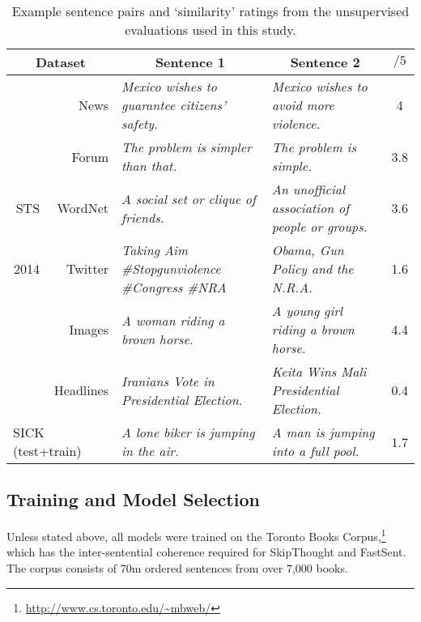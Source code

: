 \begin{table*}[ht]
\begin{adjustwidth}{-0.6cm}{}
\renewcommand{\tabcolsep}{4.6pt}
\small
\newcommand{\mc}[1]{\multicolumn{1}{l|}{#1}}
  \begin{center}

      {
        \begin{tabular}{rr|l|l|c}
          \multicolumn{2}{c|}{Dataset} & \multicolumn{1}{c}{Sentence 1} &\multicolumn{1}{|c|}{Sentence 2} & \(/5\)  \\
          \hline
          \hline
           & News &  \emph{Mexico wishes to guarantee citizens' safety.} &\emph{Mexico wishes to avoid more violence.} & 4 \\
           & Forum &  \emph{The problem is simpler than that.} &  \emph{The problem is simple.}  & 3.8 \\
           STS & WordNet &  \emph{A social set or clique of friends.} &  \emph{An unofficial association of people or groups.} & 3.6 \\
           2014 & Twitter & \emph{Taking Aim  \#Stopgunviolence \#Congress \#NRA} & \emph{Obama, Gun Policy and the N.R.A.}  & 1.6 \\
            & Images & \emph{A woman riding a brown horse.} &  \emph{A young girl riding a brown horse.} & 4.4 \\
           & Headlines &  \emph{Iranians Vote in Presidential Election.} &  \emph{Keita Wins Mali Presidential Election.} & 0.4  \\
          \hline
          \multicolumn{2}{l|}{SICK (test+train)} & \emph{A lone biker is jumping in the air.} & \emph{A man is jumping into a full pool.}  & 1.7 \\
          \hline 
        \end{tabular}

    }
    \caption{\label{unsex} Example sentence pairs and `similarity' ratings from the unsupervised evaluations used in this study.}
  \end{center}
  \vspace*{-4ex}
  \end{adjustwidth}
\end{table*}

\subsection{Training and Model Selection}



Unless stated above, all models were trained on the Toronto Books Corpus,\footnote{\scriptsize \url{http://www.cs.toronto.edu/~mbweb/}} which has the inter-sentential coherence required for SkipThought and FastSent. The corpus consists of 70m ordered sentences from over 7,000 books. 

